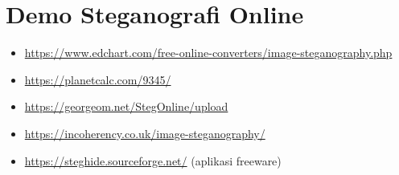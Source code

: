 \documentclass{article}
\begin{document}

\section*{Demo Steganografi Online}

\begin{itemize}
    \item \url{https://www.edchart.com/free-online-converters/image-steganography.php}
    \item \url{https://planetcalc.com/9345/}
    \item \url{https://georgeom.net/StegOnline/upload}
    \item \url{https://incoherency.co.uk/image-steganography/}
    \item \url{https://steghide.sourceforge.net/} (aplikasi freeware)
\end{itemize}
\end{document}
